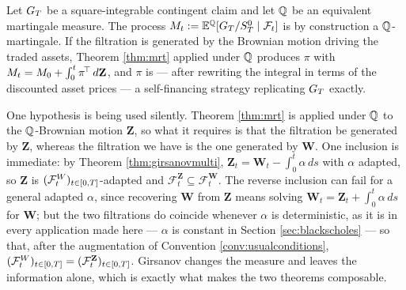 \begin{remark}\label{rem:mrtpricing}
Let $G_T$ be a square-integrable contingent claim and let $\mathbb{Q}$ be an equivalent 
martingale measure. The process 
$M_t := \mathbb{E}^{\mathbb{Q}}[G_T/S^0_T \mid \mathcal{F}_t]$ is by construction a 
$\mathbb{Q}$-martingale. If the filtration is generated 
by the Brownian motion driving the traded assets, Theorem \ref{thm:mrt} applied under $\mathbb{Q}$ 
produces $\pi$ with $M_t = M_0 + \int_0^t \pi^{\!\top}\,d\mathbf{Z}$, and $\pi$ is
--- after rewriting the integral in terms of the discounted asset prices --- a self-financing
strategy replicating $G_T$ exactly.

One hypothesis is being used silently. Theorem \ref{thm:mrt} is applied under $\mathbb{Q}$ to the $\mathbb{Q}$-Brownian motion $\mathbf{Z}$, so
what it requires is that the filtration be generated by $\mathbf{Z}$, whereas the filtration we
have is the one generated by $\mathbf{W}$. One inclusion is immediate: by Theorem \ref{thm:girsanovmulti},
$\mathbf{Z}_t = \mathbf{W}_t - \int_0^t\alpha\,ds$ with $\alpha$ adapted, so $\mathbf{Z}$ is
$(\mathcal{F}^{W}_t)_{t\in[0,T]}$-adapted and $\mathcal{F}^{\mathbf{Z}}_t \subseteq \mathcal{F}^{\mathbf{W}}_t$. The reverse
inclusion can fail for a general adapted $\alpha$, since recovering $\mathbf{W}$ from $\mathbf{Z}$
means solving $\mathbf{W}_t = \mathbf{Z}_t + \int_0^t\alpha\,ds$ for $\mathbf{W}$; but the two
filtrations do coincide whenever $\alpha$ is deterministic, as it is in every application made here
--- $\alpha$ is constant in Section \ref{sec:blackscholes} --- so that, after the augmentation of
Convention \ref{conv:usualconditions}, $(\mathcal{F}^{W}_t)_{t\in[0,T]} = (\mathcal{F}^{\mathbf{Z}}_t)_{t\in[0,T]}$. Girsanov changes the measure and leaves the
information alone, which is exactly what makes the two theorems composable.



\end{remark}
